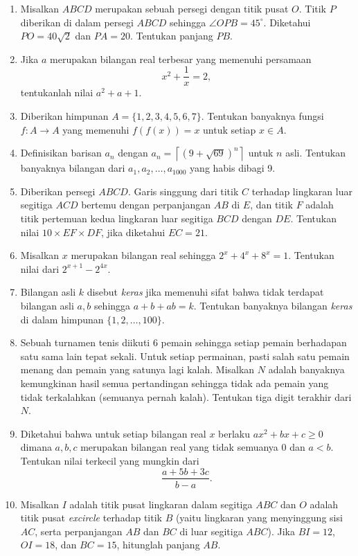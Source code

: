 \documentclass[12pt]{extarticle}
\begin{document}
\begin{enumerate}
		\item Misalkan $ABCD$ merupakan sebuah persegi dengan titik pusat $O$. Titik $P$ diberikan di dalam persegi $ABCD$ sehingga $\angle OPB = 45^\circ$. Diketahui $PO=40\sqrt{2}$ dan $PA=20$. Tentukan panjang $PB$.
		
		\item Jika $a$ merupakan bilangan real terbesar yang memenuhi persamaan $$x^2+\frac{1}{x}=2,$$ tentukanlah nilai $a^2+a+1$.
		
		\item Diberikan himpunan $A = \{1,2,3,4,5,6,7\}$. Tentukan banyaknya fungsi $f:A \rightarrow A$ yang memenuhi $f(f(x))=x$ untuk setiap $x \in A$.
		
		\item Definisikan barisan $a_n$ dengan $a_n = \left \lceil (9+\sqrt{69})^n \right \rceil$ untuk $n$ asli. Tentukan banyaknya bilangan dari $a_1, a_2,\dots, a_{1000}$ yang habis dibagi 9.
		
		\item Diberikan persegi $ABCD$. Garis singgung dari titik $C$ terhadap lingkaran luar segitiga $ACD$ bertemu dengan perpanjangan $AB$ di $E$, dan titik $F$ adalah titik pertemuan kedua lingkaran luar segitiga $BCD$ dengan $DE$. Tentukan nilai $10 \times EF\times DF$, jika diketahui $EC=21$.
		
		\item Misalkan $x$ merupakan bilangan real sehingga $2^x+4^x+8^x=1$. Tentukan nilai dari $2^{x+1}-2^{4x}$.
		
		\item Bilangan asli $k$ disebut \textit{keras} jika memenuhi sifat bahwa tidak terdapat bilangan asli $a,b$ sehingga $a+b+ab=k$. Tentukan banyaknya bilangan \textit{keras} di dalam himpunan $\{1,2,\dots,100\}$.
		
		\item Sebuah turnamen tenis diikuti 6 pemain sehingga setiap pemain berhadapan satu sama lain tepat sekali. Untuk setiap permainan, pasti salah satu pemain menang dan pemain yang satunya lagi kalah. Misalkan $N$ adalah banyaknya kemungkinan hasil semua pertandingan sehingga tidak ada pemain yang tidak terkalahkan (semuanya pernah kalah). Tentukan tiga digit terakhir dari $N$.
		
		\item Diketahui bahwa untuk setiap bilangan real $x$ berlaku $ax^2+bx+c \ge 0$ dimana $a,b,c$ merupakan bilangan real yang tidak semuanya $0$ dan $a<b$. Tentukan nilai terkecil yang mungkin dari $$\frac{a+5b+3c}{b-a}.$$
		
		\item Misalkan $I$ adalah titik pusat lingkaran dalam segitiga $ABC$ dan $O$ adalah titik pusat \textit{excircle} terhadap titik $B$ (yaitu lingkaran yang menyinggung sisi $AC$, serta perpanjangan $AB$ dan $BC$ di luar segitiga $ABC$). Jika $BI=12$, $OI=18$, dan $BC=15$, hitunglah panjang $AB$.  
\end{enumerate}
\end{document}
